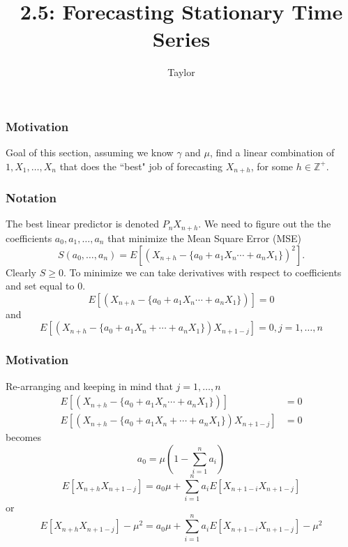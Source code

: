 \documentclass{beamer}
\title["2.5"]{2.5: Forecasting Stationary Time Series}
\author{Taylor}
\institute[UVA] 
{
University of Virginia \\
\medskip
\textit{} 
}
\date{}
\begin{document}

\begin{frame}
\titlepage 
\end{frame}

\begin{frame}
\frametitle{Motivation}

Goal of this section, assuming we know $\gamma$ and $\mu$, find a linear combination of $1, X_1, \ldots, X_n$ that does the ``best" job of forecasting $X_{n+h}$, for some $h\in \mathbb{Z}^+$.
\end{frame}


\begin{frame}
\frametitle{Notation}

The best linear predictor is denoted $P_n X_{n+h}$. We need to figure out the the coefficients $a_0, a_1, \ldots, a_n$ that minimize the Mean Square Error (MSE)
\[
S(a_0, \ldots, a_n) = E[(X_{n+h} - \{a_0 + a_1X_n\cdots + a_nX_1 \} )^2].
\]
Clearly $S \ge 0$. To minimize we can take derivatives with respect to coefficients and set equal to $0$. 
\[
E[(X_{n+h} - \{a_0 + a_1X_n\cdots + a_nX_1 \} )] = 0
\]
and
\[
E[(X_{n+h} - \{a_0 + a_1X_n + \cdots + a_n X_1 \} ) X_{n+1-j} ] = 0, j=1,\ldots,n
\]


\end{frame}



\begin{frame}
\frametitle{Motivation}

Re-arranging and keeping in mind that $j=1,\ldots,n$
\begin{align*}
E[(X_{n+h} - \{a_0 + a_1X_n\cdots + a_nX_1 \} )] &= 0 \\
E[(X_{n+h} - \{a_0 + a_1X_n + \cdots + a_n X_1 \} ) X_{n+1-j} ] &= 0
\end{align*}
becomes
\[
a_0 = \mu\left(1 - \sum_{i=1}^n a_i\right)
\]
\[
E[X_{n+h}X_{n+1-j}] =a_0\mu + \sum_{i=1}^na_i E[X_{n+1-i}X_{n+1-j} ] 
\]
or
\[
E[X_{n+h}X_{n+1-j}] - \mu^2 =a_0\mu + \sum_{i=1}^na_i E[X_{n+1-i}X_{n+1-j} ] -\mu^2
\]

\end{frame}
\end{document}
